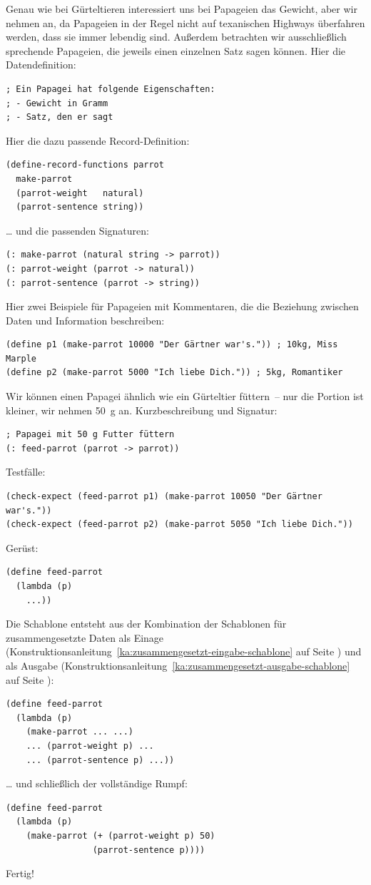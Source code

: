 Genau wie bei Gürteltieren interessiert uns bei Papageien das Gewicht,
aber wir nehmen an, da Papageien in der Regel nicht auf texanischen
Highways überfahren werden, dass sie immer lebendig sind.  Außerdem
betrachten wir ausschließlich sprechende Papageien, die jeweils einen
einzelnen Satz sagen können.  Hier die Datendefinition:
%
\begin{verbatim}
; Ein Papagei hat folgende Eigenschaften:
; - Gewicht in Gramm
; - Satz, den er sagt
\end{verbatim}
%
Hier die dazu passende Record-Definition:
%
\begin{verbatim}
(define-record-functions parrot
  make-parrot
  (parrot-weight   natural)
  (parrot-sentence string))
\end{verbatim}
%
\ldots{} und die passenden Signaturen:
%
\begin{verbatim}
(: make-parrot (natural string -> parrot))
(: parrot-weight (parrot -> natural))
(: parrot-sentence (parrot -> string))
\end{verbatim}
%
Hier zwei Beispiele für Papageien mit Kommentaren, die die Beziehung
zwischen Daten und Information beschreiben:
%
\begin{verbatim}
(define p1 (make-parrot 10000 "Der Gärtner war's.")) ; 10kg, Miss Marple
(define p2 (make-parrot 5000 "Ich liebe Dich.")) ; 5kg, Romantiker 
\end{verbatim}
%
Wir können einen Papagei ähnlich wie ein Gürteltier füttern~-- nur die
Portion ist kleiner, wir nehmen 50~g an.  Kurzbeschreibung und Signatur:
%
\begin{verbatim}
; Papagei mit 50 g Futter füttern
(: feed-parrot (parrot -> parrot))
\end{verbatim}
%
Testfälle:
%
\begin{verbatim}
(check-expect (feed-parrot p1) (make-parrot 10050 "Der Gärtner war's."))
(check-expect (feed-parrot p2) (make-parrot 5050 "Ich liebe Dich."))
\end{verbatim}
%
Gerüst:
%
\begin{verbatim}
(define feed-parrot
  (lambda (p)
    ...))
\end{verbatim}
%
Die Schablone entsteht aus der Kombination der Schablonen für
zusammengesetzte Daten
als Einage (Konstruktionsanleitung~\ref{ka:zusammengesetzt-eingabe-schablone} auf
Seite \pageref{ka:zusammengesetzt-eingabe-schablone}) und als Ausgabe
(Konstruktionsanleitung~\ref{ka:zusammengesetzt-ausgabe-schablone} auf
Seite \pageref{ka:zusammengesetzt-ausgabe-schablone}):
%
\begin{verbatim}
(define feed-parrot
  (lambda (p)
    (make-parrot ... ...)
    ... (parrot-weight p) ...
    ... (parrot-sentence p) ...))
\end{verbatim}
%
\ldots{} und schließlich der vollständige Rumpf:
%
\begin{verbatim}
(define feed-parrot
  (lambda (p)
    (make-parrot (+ (parrot-weight p) 50)
                 (parrot-sentence p))))
\end{verbatim}
%
Fertig!

